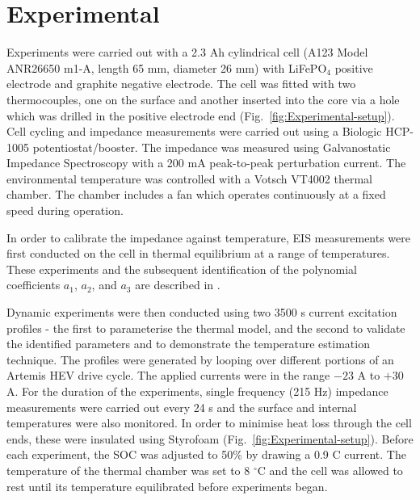 \documentclass[journal, english]{IEEEtran}
\begin{document}
\section{Experimental}
Experiments were carried out with a 2.3 Ah cylindrical cell (A123
Model ANR26650 m1-A, length 65 mm, diameter 26 mm) with LiFePO$_{4}$ positive electrode and graphite negative electrode.
The cell was fitted with two thermocouples, one on the surface and
another inserted into the core via a hole which was drilled in the
positive electrode end (Fig.\ \ref{fig:Experimental-setup}). Cell
cycling and impedance measurements were carried out using a Biologic
HCP-1005 potentiostat/booster. The impedance was measured using Galvanostatic
Impedance Spectroscopy with a 200 mA peak-to-peak perturbation
current. The environmental temperature was controlled with a Votsch
VT4002 thermal chamber. The chamber includes a fan which operates
continuously at a fixed speed during operation.

In order to calibrate the impedance against temperature, EIS measurements
were first conducted on the cell in thermal equilibrium at a
range of temperatures. These experiments and the subsequent identification
of the polynomial coefficients $a_{1}$, $a_{2}$, and $a_{3}$ are
described in \cite{Richardson2014}.

Dynamic experiments were then conducted using two 3500 s current excitation profiles
- the first to parameterise the thermal model, and the second
to validate the identified
parameters and to demonstrate the temperature estimation technique.
The profiles were generated by looping over different portions of
an Artemis HEV drive cycle.
The applied currents were in the range $-23$ A to $+30$ A. 
For the duration of the experiments, single
frequency (215 Hz) impedance measurements were carried out every 24
s and the surface and internal temperatures were also monitored. In order
to minimise heat loss through the cell ends, these were insulated using
Styrofoam (Fig.\ \ref{fig:Experimental-setup}). Before each experiment,
the SOC was adjusted to 50\% by drawing a 0.9 C current. The temperature of the thermal chamber was set to 8 $^{\circ}$C and the
cell was allowed to rest until its temperature equilibrated before experiments began.
\end{document}
